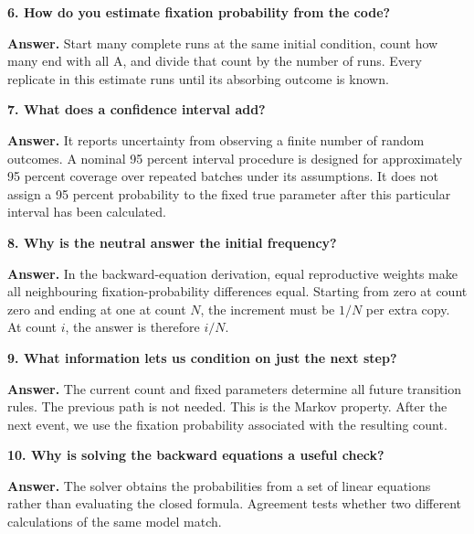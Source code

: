 \begin{checkpoint}
\textbf{6. How do you estimate fixation probability from the code?}

\textbf{Answer.} Start many complete runs at the same initial condition,
count how many end with all A, and divide that count by the number of runs.
Every replicate in this estimate runs until its absorbing outcome is known.

\textbf{7. What does a confidence interval add?}

\textbf{Answer.} It reports uncertainty from observing a finite number of
random outcomes. A nominal 95 percent interval procedure is designed for
approximately 95 percent coverage over repeated batches under its assumptions.
It does not assign a 95 percent probability to the fixed true parameter
after this particular interval has been calculated.

\textbf{8. Why is the neutral answer the initial frequency?}

\textbf{Answer.} In the backward-equation derivation, equal reproductive
weights make all neighbouring fixation-probability differences equal.
Starting from zero at count zero and ending at one at count \(N\), the
increment must be \(1/N\) per extra copy. At count \(i\), the answer is
therefore \(i/N\).

\textbf{9. What information lets us condition on just the next step?}

\textbf{Answer.} The current count and fixed parameters determine all future
transition rules. The previous path is not needed. This is the Markov
property. After the next event, we use the fixation probability associated
with the resulting count.

\textbf{10. Why is solving the backward equations a useful check?}

\textbf{Answer.} The solver obtains the probabilities from a set of linear
equations rather than evaluating the closed formula. Agreement tests whether
two different calculations of the same model match.
\end{checkpoint}

